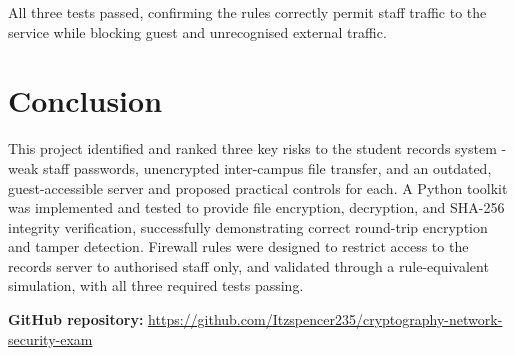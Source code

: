 \documentclass[11pt,a4paper]{article}
\begin{document}
All three tests passed, confirming the rules correctly permit staff traffic
to the service while blocking guest and unrecognised external traffic.

\section{Conclusion}

This project identified and ranked three key risks to the student records
system -weak staff passwords, unencrypted inter-campus file transfer, and
an outdated, guest-accessible server  and proposed practical controls for
each. A Python toolkit was implemented and tested to provide file
encryption, decryption, and SHA-256 integrity verification, successfully
demonstrating correct round-trip encryption and tamper detection. Firewall
rules were designed to restrict access to the records server to authorised
staff only, and validated through a rule-equivalent simulation, with all
three required tests passing.

\vspace{1em}
\noindent\textbf{GitHub repository:} \url{https://github.com/Itzspencer235/cryptography-network-security-exam}
\end{document}
